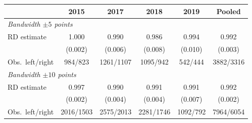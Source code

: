 \begin{tabular}{lccccc}
\toprule
 & 2015 & 2017 & 2018 & 2019 & Pooled \\
\midrule
\multicolumn{6}{l}{\emph{Bandwidth $\pm5$ points}} \\
RD estimate & 1.000 & 0.990 & 0.986 & 0.994 & 0.992 \\
 & (0.002) & (0.006) & (0.008) & (0.010) & (0.003) \\
Obs.\ left/right & 984/823 & 1261/1107 & 1095/942 & 542/444 & 3882/3316 \\
\midrule
\multicolumn{6}{l}{\emph{Bandwidth $\pm10$ points}} \\
RD estimate & 0.997 & 0.990 & 0.991 & 0.991 & 0.992 \\
 & (0.002) & (0.004) & (0.004) & (0.007) & (0.002) \\
Obs.\ left/right & 2016/1503 & 2575/2013 & 2281/1746 & 1092/792 & 7964/6054 \\
\bottomrule
\end{tabular}
